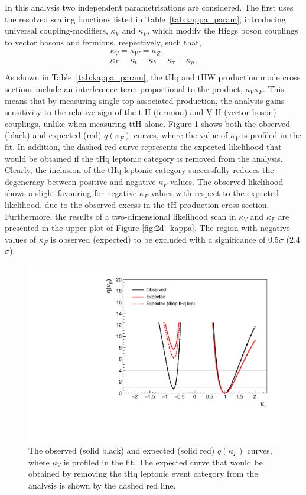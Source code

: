 In this analysis two independent parametrisations are considered. The first uses the resolved scaling functions listed in Table~\ref{tab:kappa_param}, introducing universal coupling-modifiers, $\kappa_V$ and $\kappa_F$, which modify the Higgs boson couplings to vector bosons and fermions, respectively, such that,
\begin{equation}
    \begin{split}
        \kappa_V = \kappa_W = \kappa_Z, \\
        \kappa_F = \kappa_t = \kappa_b = \kappa_\tau = \kappa_\mu. \\
    \end{split}
\end{equation}
\noindent
As shown in Table~\ref{tab:kappa_param}, the tHq and tHW production mode cross sections include an interference term proportional to the product, $\kappa_V\kappa_F$. This means that by measuring single-top associated production, the analysis gains sensitivity to the relative sign of the t-H (fermion) and V-H (vector boson) couplings, unlike when measuring ttH alone. Figure \ref{fig:kappa_F} shows both the observed (black) and expected (red) $q(\kappa_F)$ curves, where the value of $\kappa_V$ is profiled in the fit. In addition, the dashed red curve represents the expected likelihood that would be obtained if the tHq leptonic category is removed from the analysis. Clearly, the inclusion of the tHq leptonic category successfully reduces the degeneracy between positive and negative $\kappa_F$ values. The observed likelihood shows a slight favouring for negative $\kappa_F$ values with respect to the expected likelihood, due to the observed excess in the tH production cross section. Furthermore, the results of a two-dimensional likelihood scan in $\kappa_V$ and $\kappa_F$ are presented in the upper plot of Figure \ref{fig:2d_kappa}. The region with negative values of $\kappa_F$ is observed (expected) to be excluded with a significance of 0.5$\sigma$ (2.4$\sigma$).

\begin{figure}
  \centering
  \includegraphics[width=.6\textwidth]{Figures/hgg_results/profile1D_kappa_F.pdf}
  \caption[Observed and expected likelihood curves for $\kappa_F$]
  {
    The observed (solid black) and expected (solid red) $q(\kappa_F)$ curves, where $\kappa_V$ is profiled in the fit. The expected curve that would be obtained by removing the tHq leptonic event category from the analysis is shown by the dashed red line.
  }
  \label{fig:kappa_F}
\end{figure}

